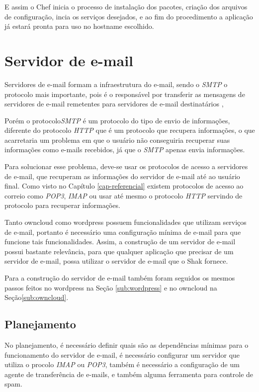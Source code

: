 E assim o Chef inicia o processo de instalação dos pacotes, criação dos arquivos
de configuração, incia os serviços desejados, e ao fim do procedimento a aplicação
já estará pronta para uso no hostname escolhido.


\section{Servidor de e-mail}
\label{sub:e-mail}

Servidores de e-mail formam a infraestrutura do e-mail, sendo o \textit{SMTP} o protocolo
mais importante, pois é o responsável por transferir as mensagens de servidores
de e-mail remetentes para servidores de e-mail destinatários \cite{kurose2010redes}, 

Porém o protocolo\textit{SMTP} é um protocolo do tipo de envio de informações, 
diferente do protocolo \textit{HTTP}
que é um protocolo que recupera informações, o que acarretaria um problema em que
o usuário não conseguiria recuperar suas informações como e-mails recebidos, já
que o \textit{SMTP} apenas envia informações.

Para solucionar esse problema, deve-se usar os protocolos de acesso a servidores de
e-mail, que recuperam as informações do servidor de e-mail até ao usuário final.
Como visto no Capítulo \ref{cap-referencial} existem protocolos de acesso ao correio
como \textit{POP3}, \textit{IMAP} ou usar até mesmo o protocolo \textit{HTTP} 
servindo de protocolo para recuperar informações.

Tanto owncloud como wordpress possuem funcionalidades que utilizam serviços 
de e-mail, portanto
é necessário uma configuração mínima de e-mail para que funcione tais funcionalidades.
Assim, a construção de um servidor de e-mail possui bastante relevância, para que
 qualquer aplicação que precisar de um servidor de e-mail, possa utilizar 
o servidor de e-mail que o Shak fornece.

Para a construção do servidor de e-mail também foram seguidos os mesmos passos
feitos no wordpress na Seção  \ref{sub:wordpress} e no owncloud na Seção\ref{sub:owncloud}. 

\subsection{Planejamento}

No planejamento, é necessário definir
quais são as dependências mínimas para o funcionamento do servidor de e-mail, é 
necessário configurar um servidor que utiliza o procolo \textit{IMAP} ou \textit{POP3},
também é necessário a configuração de um agente de transferência de e-mails, e também
alguma ferramenta para controle de spam.

